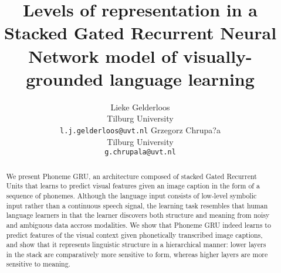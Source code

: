 \documentclass[11pt,letterpaper]{article}
\title{Levels of representation in a Stacked Gated Recurrent Neural
  Network model of visually-grounded language learning}
\author{Lieke Gelderloos \\
  Tilburg University \\
  {\tt l.j.gelderloos@uvt.nl} \And
  Grzegorz Chrupa?a \\
  Tilburg University \\
  {\tt g.chrupala@uvt.nl} }
\date{}
\begin{document}
\maketitle
\begin{abstract}
We present {Phoneme GRU}, an architecture composed of stacked Gated Recurrent Units that learns to predict visual features given an image caption in the form of a sequence of phonemes. Although the language input consists of low-level symbolic input rather than a continuous speech signal, the learning task resembles that human language learners in that the learner discovers both structure and meaning from noisy and ambiguous data accross modalities. We show that {\sc Phoneme GRU} indeed learns to predict features of the visual context given phonetically transcribed image captions, and show that it represents linguistic structure in a hierarchical manner: lower layers in the stack are comparatively more sensitive to form, whereas higher layers are more sensitive to meaning.

\end{abstract}











\end{document}
